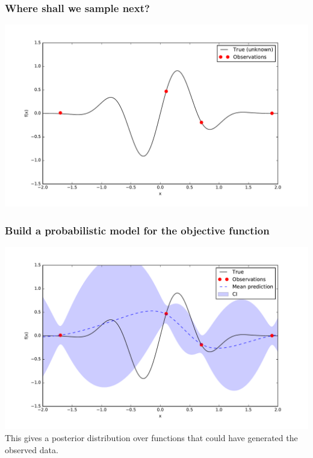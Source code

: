 \documentclass{beamer}
\begin{document}
\begin{frame}
    \frametitle{Where shall we sample next?}

    \begin{center}
        \includegraphics[width=\textwidth]{code/fig1.pdf}
    \end{center}
\end{frame}

\begin{frame}
    \frametitle{Build a probabilistic model for the objective function}
    \begin{center}
        \includegraphics[width=\textwidth]{code/fig2.pdf} \\
        This gives a posterior distribution over functions that could have generated the observed data.
    \end{center}
\end{frame}
\end{document}
